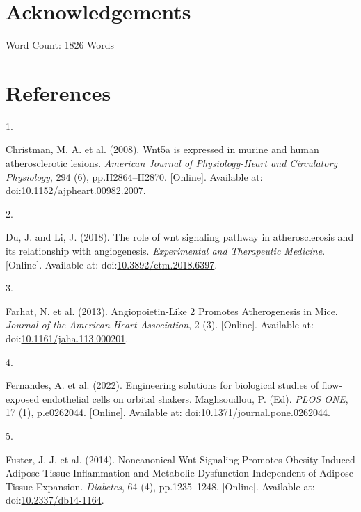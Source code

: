 \documentclass[
  11pt,
]{article}
\newlength{\cslhangindent}
\newlength{\csllabelwidth}
\newlength{\cslentryspacingunit} %
\newenvironment{CSLReferences}[2] %
 {%
  \setlength{\parindent}{0pt}
  \ifodd #1
  \let\oldpar\par
  \def\par{\hangindent=\cslhangindent\oldpar}
  \fi
  \setlength{\parskip}{#2\cslentryspacingunit}
 }%
 {}
\newcommand{\CSLLeftMargin}[1]{\parbox[t]{\csllabelwidth}{#1}}
\newcommand{\CSLRightInline}[1]{\parbox[t]{\linewidth - \csllabelwidth}{#1}\break}
\begin{document}
\hypertarget{acknowledgements}{%
\section{Acknowledgements}\label{acknowledgements}}

\begin{flushright}
Word Count: 1826 Words
\end{flushright}

\hypertarget{references}{%
\section{References}\label{references}}

\small

\hypertarget{refs}{}
\begin{CSLReferences}{0}{0}
\leavevmode{}%
\CSLLeftMargin{1. }
\CSLRightInline{Christman, M. A. {et al.} (2008). {Wnt5a is expressed in murine and human atherosclerotic lesions}. \emph{American Journal of Physiology-Heart and Circulatory Physiology}, 294 (6), pp.H2864--H2870. {[}Online{]}. Available at: doi:\href{https://doi.org/10.1152/ajpheart.00982.2007}{10.1152/ajpheart.00982.2007}.}

\leavevmode{}%
\CSLLeftMargin{2. }
\CSLRightInline{Du, J. and Li, J. (2018). {The role of wnt signaling pathway in atherosclerosis and its relationship with angiogenesis}. \emph{Experimental and Therapeutic Medicine}. {[}Online{]}. Available at: doi:\href{https://doi.org/10.3892/etm.2018.6397}{10.3892/etm.2018.6397}.}

\leavevmode{}%
\CSLLeftMargin{3. }
\CSLRightInline{Farhat, N. {et al.} (2013). {Angiopoietin{-}Like 2 Promotes Atherogenesis in Mice}. \emph{Journal of the American Heart Association}, 2 (3). {[}Online{]}. Available at: doi:\href{https://doi.org/10.1161/jaha.113.000201}{10.1161/jaha.113.000201}.}

\leavevmode{}%
\CSLLeftMargin{4. }
\CSLRightInline{Fernandes, A. {et al.} (2022). {Engineering solutions for biological studies of flow-exposed endothelial cells on orbital shakers}. Maghsoudlou, P. (Ed). \emph{PLOS ONE}, 17 (1), p.e0262044. {[}Online{]}. Available at: doi:\href{https://doi.org/10.1371/journal.pone.0262044}{10.1371/journal.pone.0262044}.}

\leavevmode{}%
\CSLLeftMargin{5. }
\CSLRightInline{Fuster, J. J. {et al.} (2014). {Noncanonical Wnt Signaling Promotes Obesity-Induced Adipose Tissue Inflammation and Metabolic Dysfunction Independent of Adipose Tissue Expansion}. \emph{Diabetes}, 64 (4), pp.1235--1248. {[}Online{]}. Available at: doi:\href{https://doi.org/10.2337/db14-1164}{10.2337/db14-1164}.}


\end{CSLReferences}
\end{document}

